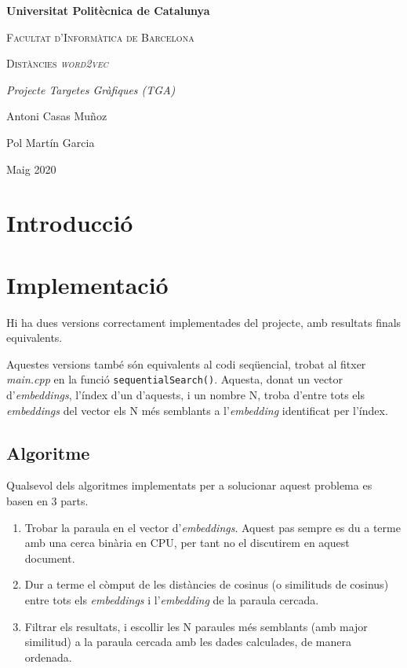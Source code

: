 \documentclass[catalan,10pt,a4paper]{article}
\begin{document}
	\begin{titlepage}
		\centering
		{\bfseries\LARGE Universitat Politècnica de Catalunya \par}
		\vspace{1cm}
		{\scshape\Large Facultat d'Informàtica de Barcelona\par}
		\vspace{3cm}
		{\scshape\Huge Distàncies \textit{word2vec} \par}
		\vspace{3cm}
		{\itshape\Large Projecte Targetes Gràfiques (TGA) \par}
		\vfill
		{\Large Antoni Casas Muñoz \par}
		{\Large Pol Martín Garcia \par}
		\vfill
		{\Large Maig 2020 \par}
	\end{titlepage}
	
	\newpage
	
	\section*{Introducció}
	
	\section*{Implementació}
	Hi ha dues versions correctament implementades del projecte, amb resultats finals equivalents.
	
	Aquestes versions també són equivalents al codi seqüencial, trobat al fitxer \textit{main.cpp} en la funció \verb|sequentialSearch()|. Aquesta, donat un vector d'\textit{embeddings}, l'índex d'un d'aquests, i un nombre N, troba d'entre tots els \textit{embeddings} del vector els N més semblants a l'\textit{embedding} identificat per l'índex.
	
	\subsection*{Algoritme}
	Qualsevol dels algoritmes implementats per a solucionar aquest problema es basen en 3 parts.
	\begin{enumerate}
		\item Trobar la paraula en el vector d'\textit{embeddings}. Aquest pas sempre es du a terme amb una cerca binària en CPU, per tant no el discutirem en aquest document.
		\item Dur a terme el còmput de les distàncies de cosinus (o similituds de cosinus) entre tots els \textit{embeddings} i l'\textit{embedding} de la paraula cercada.
		\item Filtrar els resultats, i escollir les N paraules més semblants (amb major similitud) a la paraula cercada amb les dades calculades, de manera ordenada.
	\end{enumerate}
	
\end{document}
